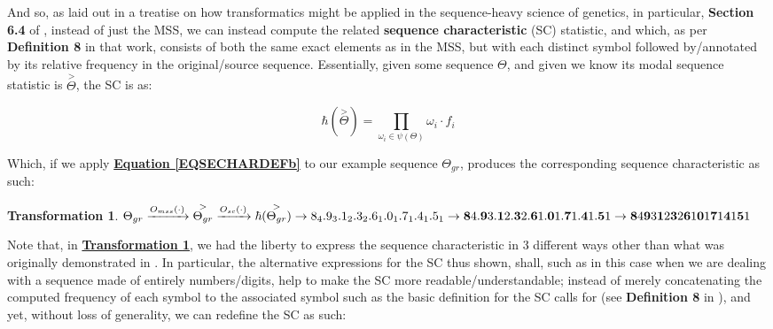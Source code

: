 \documentclass[a4paper, 18pt]{book} %
\newtheorem{trans}{Transformation}
\begin{document}
And so, as laid out in a treatise on how transformatics might be applied in the sequence-heavy science of genetics\cite{lutalo_2025_trans_genetics}, in particular, \textbf{Section 6.4} of \cite{lutalo_2025_trans_genetics}, instead of just the MSS, we can instead compute the related \textbf{sequence characteristic} (SC) statistic, and which, as per \textbf{Definition 8} in that work, consists of both the same exact elements as in the MSS, but with each distinct symbol followed by/annotated by its relative frequency in the original/source sequence. Essentially, given some sequence $\Theta$, and given we know its modal sequence statistic is $\overset{>}{\Theta}$, the SC is as:

\vspace{1em}
\begin{equation}
\label{EQSECHARDEFb}
 \hbar(\overset{>}{\Theta}) = \prod\limits_{\omega_i \in \psi(\Theta)} \omega_i\cdot f_i
\end{equation}
\vspace{1em}

Which, if we apply \textbf{\hyperref[EQSECHARDEFb]{Equation \ref{EQSECHARDEFb}}} to our example sequence $\Theta_{gr}$, produces the corresponding sequence characteristic as such:

\vspace{1em}
\begin{trans}
\label{TRANSSCGRb}
$ \Theta_{gr} \xrightarrow{O_{mss}(\cdot)} \overset{>}{\Theta_{gr}}  \xrightarrow{O_{sc}(\cdot)} \hbar(\overset{>}{\Theta_{gr}}) \rightarrow 8_4.9_3.1_2.3_2.6_1.0_1.7_1.4_1.5_1 \\
 \rightarrow \textbf{8}4.\textbf{9}3.\textbf{1}2.\textbf{3}2.\textbf{6}1.\textbf{0}1.\textbf{7}1.\textbf{4}1.\textbf{5}1 \rightarrow \textbf{8}4\textbf{9}3\textbf{1}2\textbf{3}2\textbf{6}1\textbf{0}1\textbf{7}1\textbf{4}1\textbf{5}1$
\end{trans}
\vspace{1em}

Note that, in \textbf{\hyperref[TRANSSCGRb]{Transformation \ref{TRANSSCGRb}}}, we had the liberty to express the sequence characteristic in 3 different ways other than what was originally demonstrated in \cite{lutalo_2025_trans_genetics}. In particular, the alternative expressions for the SC thus shown, shall, such as in this case when we are dealing with a sequence made of entirely numbers/digits, help to make the SC more readable/understandable; instead of merely concatenating the computed frequency of each symbol to the associated symbol such as the basic definition for the SC calls for (see \textbf{Definition 8} in \cite{lutalo_2025_trans_genetics}), and yet, without loss of generality, we can redefine the SC as such:
\end{document}
